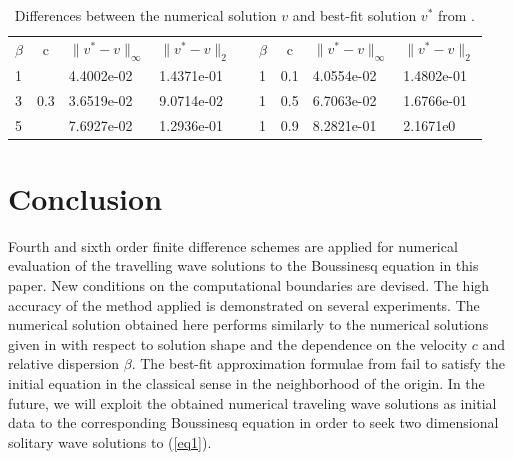 \documentclass[preprint]{elsarticle}
\newcommand{\rf}[1]{(\ref{#1})}
\begin{document}
\begin{center}
\begin{table}[ht]
\centering
\resizebox{12cm}{!} {
		\begin{tabular}{|l|c|l l| c|l|c|l l|}
			\cline{1-4}\cline{6-9}
$\beta$&c&$\|v^*-v \|_{\infty }$&$\|v^*-v \|_{2 }$& &$\beta$& c&$\|v^*-v \|_{\infty }$&$\|v^*-v \|_{2 }$\\
			\cline{1-4}\cline{6-9}
1&     &4.4002e-02 & 1.4371e-01 & &    1& 0.1& 4.0554e-02  &1.4802e-01\\
3& 0.3 &3.6519e-02 & 9.0714e-02& &    1& 0.5& 6.7063e-02  &1.6766e-01\\
5&     &7.6927e-02 & 1.2936e-01 & &    1& 0.9&  8.2821e-01 &2.1671e0\\
			\cline{1-4}\cline{6-9}
\end{tabular}
}
		\caption{Differences between the numerical solution $v$ and best-fit solution $v^*$ from \cite{Ch2011}.}
\label{tab:first-der-t}
\end{table}
\end{center}


\section{Conclusion}
Fourth and sixth order finite difference schemes are applied for numerical evaluation of the travelling wave solutions to the Boussinesq equation in this paper. New conditions on the computational boundaries are devised. The high accuracy of the method applied is demonstrated on several experiments. The numerical solution obtained here performs similarly to the numerical solutions given in \cite{Ch2011,Ch2012} with respect to solution shape and the dependence on the velocity $c$ and relative dispersion $\beta$. 
The best-fit approximation formulae from  \cite{Ch2011} fail to satisfy the initial equation in the classical sense in the neighborhood of the origin. 
In the future, we will exploit the obtained numerical traveling wave solutions as initial data to the corresponding Boussinesq equation in order to seek two dimensional solitary wave solutions to \rf{eq1}.
\end{document}
